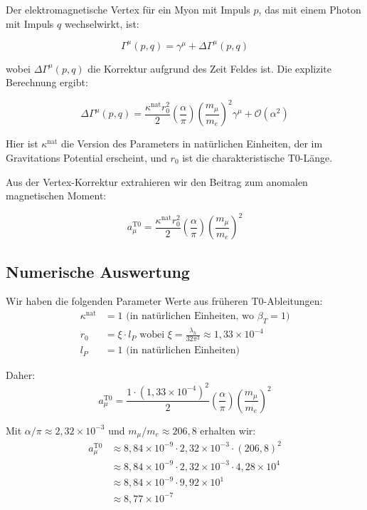 \documentclass[12pt,a4paper]{article}
\begin{document}
	Der elektromagnetische Vertex für ein Myon mit Impuls $p$, das mit einem Photon mit Impuls $q$ wechselwirkt, ist:
	
	\begin{equation}
		\Gamma^{\mu}(p,q) = \gamma^{\mu} + \Delta\Gamma^{\mu}(p,q)
	\end{equation}
	
	wobei $\Delta\Gamma^{\mu}(p,q)$ die Korrektur aufgrund des Zeit Feldes ist. Die explizite Berechnung ergibt:
	
	\begin{equation}
		\Delta\Gamma^{\mu}(p,q) = \frac{\kappa^{\text{nat}}r_0^2}{2}\left(\frac{\alpha}{\pi}\right)\left(\frac{m_\mu}{m_e}\right)^2\gamma^{\mu} + \mathcal{O}(\alpha^2)
	\end{equation}
	
	Hier ist $\kappa^{\text{nat}}$ die Version des Parameters in natürlichen Einheiten, der im Gravitations Potential erscheint, und $r_0$ ist die charakteristische T0-Länge.
	
	Aus der Vertex-Korrektur extrahieren wir den Beitrag zum anomalen magnetischen Moment:
	
	\begin{equation}
		a_\mu^{\text{T0}} = \frac{\kappa^{\text{nat}}r_0^2}{2}\left(\frac{\alpha}{\pi}\right)\left(\frac{m_\mu}{m_e}\right)^2
	\end{equation}
	
	\subsection{Numerische Auswertung}
	
	Wir haben die folgenden Parameter Werte aus früheren T0-Ableitungen:
	\begin{align}
		\kappa^{\text{nat}} &= 1 \text{ (in natürlichen Einheiten, wo $\beta_T = 1$)} \\
		r_0 &= \xi \cdot l_P \text{ wobei } \xi = \frac{\lambda_h}{32\pi^3} \approx 1,33 \times 10^{-4} \\
		l_P &= 1 \text{ (in natürlichen Einheiten)}
	\end{align}
	
	Daher:
	\begin{equation}
		a_\mu^{\text{T0}} = \frac{1 \cdot (1,33 \times 10^{-4})^2}{2}\left(\frac{\alpha}{\pi}\right)\left(\frac{m_\mu}{m_e}\right)^2
	\end{equation}
	
	Mit $\alpha/\pi \approx 2,32 \times 10^{-3}$ und $m_\mu/m_e \approx 206,8$ erhalten wir:
	\begin{align}
		a_\mu^{\text{T0}} &\approx 8,84 \times 10^{-9} \cdot 2,32 \times 10^{-3} \cdot (206,8)^2 \\
		&\approx 8,84 \times 10^{-9} \cdot 2,32 \times 10^{-3} \cdot 4,28 \times 10^4 \\
		&\approx 8,84 \times 10^{-9} \cdot 9,92 \times 10^1 \\
		&\approx 8,77 \times 10^{-7}
	\end{align}
	
\end{document}
